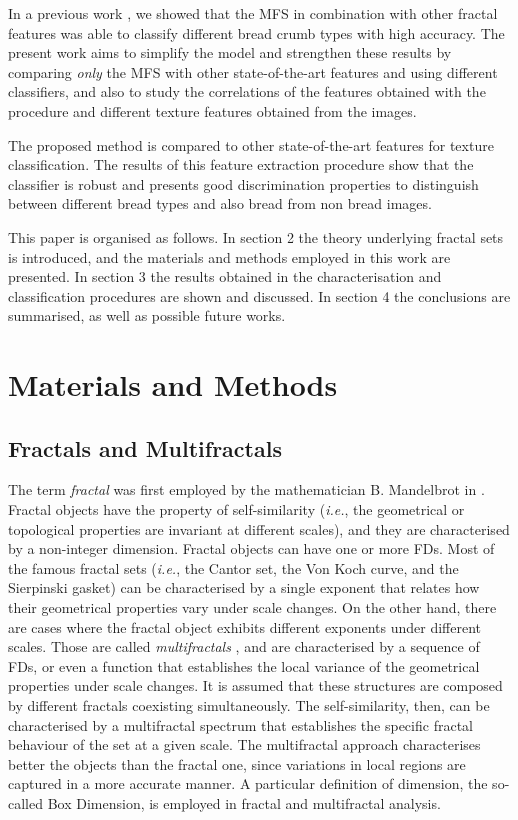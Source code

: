 \documentclass[twocolumn]{bmcart}%
\begin{document}
In a previous work \cite{Baravalle2012_2}, we showed that the MFS in combination with other fractal features was able to classify different bread crumb types with high accuracy. The present work aims to simplify the model and strengthen these results by comparing {\em only} the MFS with other state-of-the-art features and using different classifiers, and also to study the correlations of the features obtained with the procedure and different texture features obtained from the images.

The proposed method is compared to other state-of-the-art features for texture classification. The results of this feature extraction procedure show that the classifier is robust and presents good discrimination properties to distinguish between different bread types and also bread from non bread images.

This paper is organised as follows. In section 2 the theory underlying fractal sets is introduced, and the materials and methods employed in this work are presented. In section 3 the results obtained in the characterisation and classification procedures are shown and discussed. In section 4 the conclusions are summarised, as well as possible future works.

\section{Materials and Methods}
\label{sec:1}
\subsection{Fractals and Multifractals}
\label{sec:2}

The term {\em fractal} was first employed by the mathematician B. Mandelbrot in \cite{Mandelbrot83}. Fractal objects have the property of self-similarity ({\em i.e.}, the geometrical or topological properties are invariant at different scales), and they are characterised by a non-integer dimension. Fractal objects can have one or more FDs. Most of the famous fractal sets ({\em i.e.}, the Cantor set, the Von Koch curve, and the Sierpinski gasket) can be characterised by a single exponent that relates how their geometrical properties vary under scale changes. On the other hand, there are cases where the fractal object exhibits different exponents under different scales. Those are called {\it multifractals} \cite{Mandelbrot89}, and are characterised by a sequence of FDs, or even a function that establishes the local variance of the geometrical properties under scale changes. It is assumed that these structures are composed by different fractals coexisting simultaneously. The self-similarity, then, can be characterised by a multifractal spectrum that establishes the specific fractal behaviour of the set at a given scale. The multifractal approach characterises better the objects than the fractal one, since variations in local regions are captured in a more accurate manner. A particular definition of dimension, the so-called Box Dimension, is employed in fractal and multifractal analysis.
\end{document}
